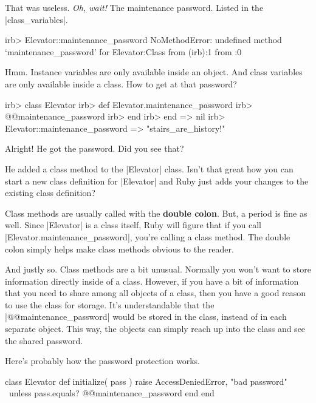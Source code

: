 \documentclass[12pt,twoside]{report}
\begin{document}
That was useless.  {\em Oh, wait!}  The maintenance password.  Listed
in the \rubyinline|class_variables|.


\begin{consolecode}

 irb> Elevator::maintenance_password
 NoMethodError: undefined method `maintenance_password' for Elevator:Class
         from (irb):1
         from :0

\end{consolecode}


Hmm.  Instance variables are only available inside an object.  And
class variables are only available inside a class.  How to get at that
password?


\begin{consolecode}

 irb> class Elevator
 irb>   def Elevator.maintenance_password
 irb>     @@maintenance_password
 irb>   end
 irb> end
   => nil
 irb> Elevator::maintenance_password
   => "stairs_are_history!"

\end{consolecode}


Alright!  He got the password.  Did you see that?

He added a class method to the \rubyinline|Elevator|
class.  Isn't that great how you can start a new class definition for
\rubyinline|Elevator| and Ruby just adds your changes
to the existing class definition?

Class methods are usually called with the {\bf double colon}.  But, a
period is fine as well. Since \rubyinline|Elevator| is
a class itself, Ruby will figure that if you call
\rubyinline|Elevator.maintenance_password|, you're
calling a class method.  The double colon simply helps make class
methods obvious to the reader.

And justly so.  Class methods are a bit unusual.  Normally you won't
want to store information directly inside of a class.  However, if you
have a bit of information that you need to share among all objects of
a class, then you have a good reason to use the class for
storage. It's understandable that the
\rubyinline|@@maintenance_password| would be stored in
the class, instead of in each separate object.  This way, the objects
can simply reach up into the class and see the shared password.

Here's probably how the password protection works.


\begin{rubycode}

 class Elevator
   def initialize( pass )
     raise AccessDeniedError, "bad password" \
       unless pass.equals? @@maintenance_password
   end
 end

\end{rubycode}
\end{document}
